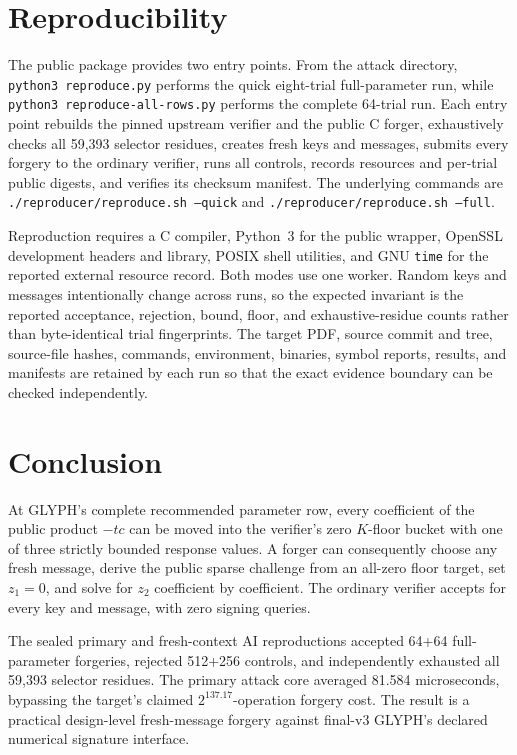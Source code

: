 \documentclass[10pt,a4paper]{article}
\begin{document}
\section{Reproducibility}

The public package provides two entry points.  From the attack directory,
\texttt{python3 reproduce.py} performs the quick eight-trial full-parameter
run, while \texttt{python3 reproduce-all-rows.py} performs the complete
64-trial run.  Each entry point rebuilds the pinned upstream verifier and the
public C forger, exhaustively checks all 59,393 selector residues, creates
fresh keys and messages, submits every forgery to the ordinary verifier, runs
all controls, records resources and per-trial public digests, and verifies its
checksum manifest.  The underlying commands are
\texttt{./reproducer/reproduce.sh --quick} and
\texttt{./reproducer/reproduce.sh --full}.

Reproduction requires a C compiler, Python~3 for the public wrapper,
OpenSSL development headers and library, POSIX shell utilities, and GNU
\texttt{time} for the reported external resource record.  Both modes use
one worker.  Random keys and messages intentionally change across runs, so
the expected invariant is the reported acceptance, rejection, bound, floor,
and exhaustive-residue counts rather than byte-identical trial fingerprints.
The target PDF, source commit and tree, source-file hashes, commands,
environment, binaries, symbol reports, results, and manifests are retained by
each run so that the exact evidence boundary can be checked independently.

\section{Conclusion}

At GLYPH's complete recommended parameter row, every coefficient of the
public product $-tc$ can be moved into the verifier's zero $K$-floor bucket
with one of three strictly bounded response values.  A forger can consequently
choose any fresh
message, derive the public sparse challenge from an all-zero floor target,
set $z_1=0$, and solve for $z_2$ coefficient by coefficient.  The ordinary
verifier accepts for every key and message, with zero signing queries.

The sealed primary and fresh-context AI reproductions accepted 64+64
full-parameter forgeries, rejected 512+256 controls, and independently
exhausted all 59,393 selector residues.  The primary attack core averaged
81.584 microseconds, bypassing the target's claimed $2^{137.17}$-operation
forgery cost.  The result is a practical design-level fresh-message forgery
against final-v3 GLYPH's declared numerical signature interface.
\end{document}
